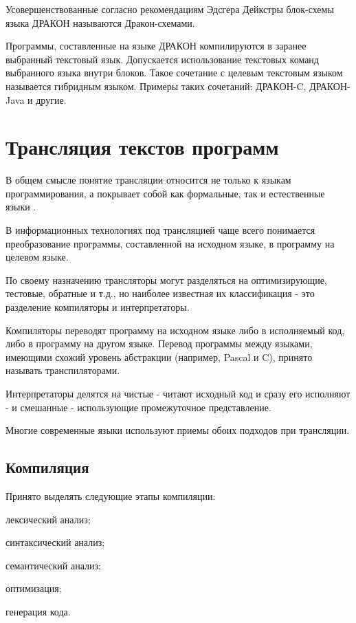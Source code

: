 Усовершенствованные согласно рекомендациям Эдсгера Дейкстры блок-схемы языка ДРАКОН называются Дракон-схемами.

Программы, составленные на языке ДРАКОН компилируются в заранее выбранный текстовый язык. Допускается использование текстовых команд выбранного языка внутри блоков. Такое сочетание с целевым текстовым языком называется гибридным языком. Примеры таких сочетаний: ДРАКОН-C, ДРАКОН-Java и другие.

\section{Трансляция текстов программ}
В общем смысле понятие трансляции относится не только к языкам программирования, а покрывает собой как формальные, так и естественные языки \cite{trans-dict}.

В информационных технологиях под трансляцией чаще всего понимается преобразование программы, составленной на исходном языке, в программу на целевом языке.

По своему назначению трансляторы могут разделяться на оптимизирующие, тестовые, обратные и т.д., но наиболее известная их классификация - это разделение компиляторы и интерпретаторы.

Компиляторы переводят программу на исходном языке либо в исполняемый код, либо в программу на другом языке. Перевод программы между языками, имеющими схожий уровень абстракции (например, Pascal и C), принято называть транспиляторами.

Интерпретаторы делятся на чистые - читают исходный код и сразу его исполняют - и смешанные - использующие промежуточное представление.

Многие современные языки используют приемы обоих подходов при трансляции.

\subsection{Компиляция}

Принято выделять следующие этапы компиляции:

\begin{enumerate*}
	\item лексический анализ;
	\item синтаксический анализ;
	\item семантический анализ;
	\item оптимизация;
	\item генерация кода.
\end{enumerate*}


